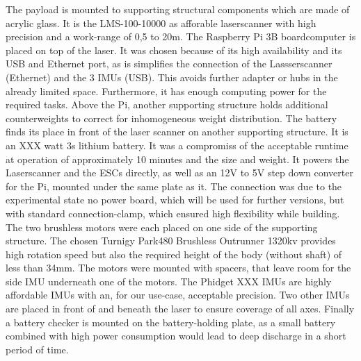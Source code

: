 The payload is mounted to supporting structural components which are made of acrylic glass. It is the LMS-100-10000 as afforable laserscanner with high precision and a work-range of 0,5 to 20m.
The Raspberry Pi 3B boardcomputer is placed on top of the laser. It was chosen because of its high availability and its USB and Ethernet port, as is simplifies the connection of the Lassserscanner (Ethernet) and the 3 IMUs (USB). This avoids further adapter or hubs in the already limited space. Furthermore, it has enough computing power for the required tasks.
Above the Pi, another supporting structure holds additional counterweights to correct for inhomogeneous weight distribution.                                                                                                     
The battery finds its place in front of the laser scanner on another supporting structure. It is an XXX watt 3s lithium battery. It was a compromiss of the acceptable runtime at operation of approximately 10 minutes and the size and weight. It powers the Laserscanner and the ESCs directly, as well as an 12V to 5V step down converter for the Pi, mounted under the same plate as it.  The connection was due to the experimental state no power board, which will be used for further versions, but with standard connection-clamp, which ensured high flexibility while building. 
The two brushless motors were each placed on one side of the supporting structure. The chosen Turnigy Park480 Brushless Outrunner 1320kv provides high rotation speed but also the required height of the body (without shaft) of less than 34mm.
The motors were mounted with spacers, that leave room for the side IMU underneath one of the motors. 
The Phidget XXX IMUs are highly affordable IMUs with an, for our use-case, acceptable precision.
Two other IMUs are placed in front of and beneath the laser to ensure coverage of all axes. 
Finally a battery checker is mounted on the battery-holding plate, as a small battery combined with high power consumption would lead to deep discharge in a short period of time.

